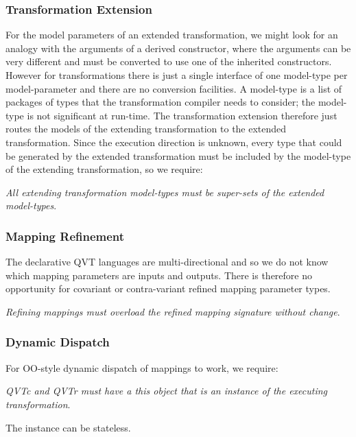 \documentclass[runningheads,a4paper]{llncs}
\begin{document}
\subsubsection{Transformation Extension}

For the model parameters of an extended transformation, we might look for an analogy with the arguments of a derived constructor, where the arguments can be very different and must be converted to use one of the inherited constructors. However for transformations there is just a single interface of one model-type per model-parameter and there are no conversion facilities. A model-type is a list of packages of types that the transformation compiler needs to consider; the model-type is not significant at run-time. The transformation extension therefore just routes the models of the extending transformation to the extended transformation. Since the execution direction is unknown, every type that could be generated by the extended transformation must be included by the model-type of the extending transformation, so we require:

\emph{All extending transformation model-types must be super-sets of the extended model-types}. 

\subsubsection{Mapping Refinement}

The declarative QVT languages are multi-directional and so we do not know which mapping parameters are inputs and outputs. There is therefore no opportunity for covariant or contra-variant refined mapping parameter types.

\emph{Refining mappings must overload the refined mapping signature without change}.

\subsubsection{Dynamic Dispatch}

For OO-style dynamic dispatch of mappings to work, we require:

\emph{QVTc and QVTr must have a this object that is an instance of the executing transformation}. 

The instance can be stateless. 
\end{document}
